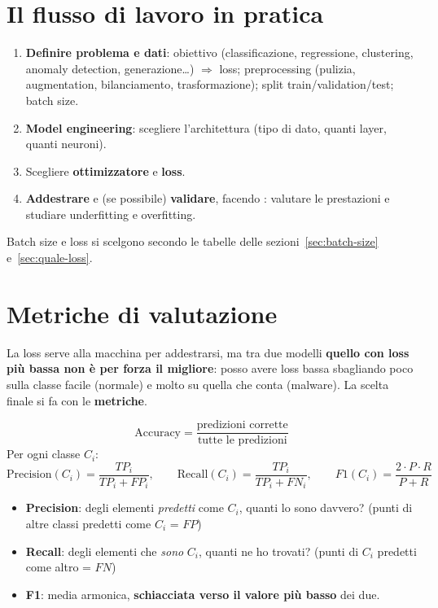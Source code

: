 \section{Il flusso di lavoro in pratica}
\begin{enumerate}
  \item \textbf{Definire problema e dati}: obiettivo (classificazione, regressione, clustering, anomaly detection,
        generazione\ldots) $\Rightarrow$ loss; preprocessing (pulizia, augmentation, bilanciamento, trasformazione); split
        train/validation/test; batch size.
  \item \textbf{Model engineering}: scegliere l'architettura (tipo di dato, quanti layer, quanti neuroni).
  \item Scegliere \textbf{ottimizzatore} e \textbf{loss}.
  \item \textbf{Addestrare} e (se possibile) \textbf{validare}, facendo : valutare le prestazioni e
        studiare underfitting e overfitting.
\end{enumerate}
Batch size e loss si scelgono secondo le tabelle delle sezioni~\ref{sec:batch-size} e~\ref{sec:quale-loss}.

\section{Metriche di valutazione}
\begin{attenzione}
La loss serve alla macchina per addestrarsi, ma tra due modelli \textbf{quello con loss più bassa non è per forza il
migliore}: posso avere loss bassa sbagliando poco sulla classe facile (normale) e molto su quella che conta (malware).
La scelta finale si fa con le \textbf{metriche}.
\end{attenzione}

\begin{definizione}
\[
\text{Accuracy} = \frac{\text{predizioni corrette}}{\text{tutte le predizioni}}
\]
Per ogni classe $C_i$:
\[
\text{Precision}(C_i) = \frac{TP_i}{TP_i + FP_i}, \qquad
\text{Recall}(C_i) = \frac{TP_i}{TP_i + FN_i}, \qquad
F1(C_i) = \frac{2\cdot P\cdot R}{P + R}
\]
\begin{itemize}
  \item \textbf{Precision}: degli elementi \emph{predetti} come $C_i$, quanti lo sono davvero? (punti di altre classi predetti come $C_i$ = $FP$)
  \item \textbf{Recall}: degli elementi che \emph{sono} $C_i$, quanti ne ho trovati? (punti di $C_i$ predetti come altro = $FN$)
  \item \textbf{F1}: media armonica, \textbf{schiacciata verso il valore più basso} dei due.
\end{itemize}
\end{definizione}


